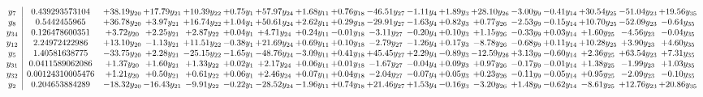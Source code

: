 \documentclass[9pt]{article}
\begin{document}
\[\begin{array}{c| c c@{\hskip 2pt} c@{\hskip 2pt} c@{\hskip 2pt} c@{\hskip 2pt} c@{\hskip 2pt} c@{\hskip 2pt} c@{\hskip 2pt} c@{\hskip 2pt} c@{\hskip 2pt} c@{\hskip 2pt} c@{\hskip 2pt} c@{\hskip 2pt} c@{\hskip 2pt} c@{\hskip 2pt} c@{\hskip 2pt} c@{\hskip 2pt} }
 y_{7}   &  0.439293573104 & + 38.19 y_{20} & + 17.79 y_{21} & + 10.39 y_{22} & +  0.75 y_{1} & + 57.97 y_{24} & +  1.68 y_{11} & +  0.76 y_{18} & -46.51 y_{27} & -1.11 y_{4} & +  1.89 y_{3} & + 28.10 y_{26} & -3.00 y_{9} & -0.41 y_{14} & + 30.54 y_{25} & -51.04 y_{23} & + 19.56 y_{35}\\
 y_{8}   &  0.5442455965 & + 36.78 y_{20} & +  3.97 y_{21} & + 16.74 y_{22} & +  1.04 y_{1} & + 50.61 y_{24} & +  2.62 y_{11} & +  0.29 y_{18} & -29.91 y_{27} & -1.63 y_{4} & +  0.82 y_{3} & +  0.77 y_{26} & -2.53 y_{9} & -0.15 y_{14} & + 10.70 y_{25} & -52.09 y_{23} & -0.64 y_{35}\\
 y_{34}   &  0.126478600351 & +  3.72 y_{20} & +  2.25 y_{21} & +  2.87 y_{22} & +  0.04 y_{1} & +  4.71 y_{24} & +  0.24 y_{11} & -0.01 y_{18} & -3.11 y_{27} & -0.20 y_{4} & +  0.10 y_{3} & +  1.15 y_{26} & -0.33 y_{9} & +  0.03 y_{14} & +  1.60 y_{25} & -4.56 y_{23} & -0.04 y_{35}\\
 y_{12}   &  2.24972422986 & + 13.10 y_{20} & -1.13 y_{21} & + 11.51 y_{22} & -0.38 y_{1} & + 21.69 y_{24} & +  0.69 y_{11} & +  0.10 y_{18} & -2.79 y_{27} & -1.26 y_{4} & +  0.17 y_{3} & -8.78 y_{26} & -0.68 y_{9} & +  0.11 y_{14} & + 10.28 y_{25} & +  3.90 y_{23} & +  4.60 y_{35}\\
 y_{5}   &  1.40581638775 & -33.75 y_{20} & +  2.28 y_{21} & -25.15 y_{22} & -1.65 y_{1} & -48.76 y_{24} & -3.09 y_{11} & +  0.41 y_{18} & + 45.45 y_{27} & +  2.29 y_{4} & -0.89 y_{3} & -12.59 y_{26} & +  3.13 y_{9} & -0.60 y_{14} & +  2.36 y_{25} & + 63.54 y_{23} & +  7.31 y_{35}\\
 y_{31}   &  0.0411589062086 & +  1.37 y_{20} & +  1.60 y_{21} & +  1.33 y_{22} & +  0.02 y_{1} & +  2.17 y_{24} & +  0.06 y_{11} & +  0.01 y_{18} & -1.67 y_{27} & -0.04 y_{4} & +  0.09 y_{3} & +  0.97 y_{26} & -0.17 y_{9} & -0.01 y_{14} & +  1.38 y_{25} & -1.99 y_{23} & +  1.03 y_{35}\\
 y_{32}   &  0.00124310005476 & +  1.21 y_{20} & +  0.50 y_{21} & +  0.61 y_{22} & +  0.06 y_{1} & +  2.46 y_{24} & +  0.07 y_{11} & +  0.04 y_{18} & -2.04 y_{27} & -0.07 y_{4} & +  0.05 y_{3} & +  0.23 y_{26} & -0.11 y_{9} & -0.05 y_{14} & +  0.95 y_{25} & -2.09 y_{23} & -0.10 y_{35}\\
 y_{2}   &  0.204653884289 & -18.32 y_{20} & -16.43 y_{21} & -9.91 y_{22} & -0.22 y_{1} & -28.52 y_{24} & -1.96 y_{11} & +  0.74 y_{18} & + 21.46 y_{27} & +  1.53 y_{4} & -0.16 y_{3} & -3.20 y_{26} & +  1.48 y_{9} & -0.62 y_{14} & -8.61 y_{25} & + 12.76 y_{23} & + 20.86 y_{35}\\

\end{array}\]
\end{document}
